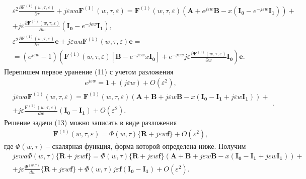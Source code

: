 \begin{equation}
	\begin{split}
		&\varepsilon^{2}\frac{\partial \boldsymbol{F}^{(1)}(w,\tau,\varepsilon)}{\partial \tau}+j\varepsilon wa\boldsymbol{F}^{(1)}(w,\tau,\varepsilon)=\boldsymbol{F}^{(1)}(w,\tau,\varepsilon)(\boldsymbol{A}+e^{j\varepsilon w}\boldsymbol{B}-x(\boldsymbol{I_{0}}-e^{-j\varepsilon w}\boldsymbol{I_{1}}))+\\
		&+j\varepsilon \frac{\partial\boldsymbol{F}^{(1)}(w,\tau,\varepsilon)}{\partial w}(\boldsymbol{I_{0}}-e^{-j\varepsilon w}\boldsymbol{I_{1}}),\\
		&\varepsilon^{2}\frac{\partial \boldsymbol{F}^{(1)}(w,\tau,\varepsilon)}{\partial \tau}\boldsymbol{e}+j\varepsilon wa\boldsymbol{F}^{(1)}(w,\tau,\varepsilon)\boldsymbol{e} =\\
		&=(e^{j\varepsilon w}-1)(\boldsymbol{F}^{(1)}(w,\tau,\varepsilon)[\boldsymbol{B}-e^{-j\varepsilon w}x\boldsymbol{I_{0}}]+e^{-j\varepsilon w}j\varepsilon \frac{\partial\boldsymbol{F}^{(1)}(w,\tau,\varepsilon)}{\partial w}\boldsymbol{I_{0}})\boldsymbol{e}.
	\end{split}
\end{equation}
Перепишем первое уранение (11) с учетом разложения
\begin{align}
	e^{j\varepsilon w}=1+(j\varepsilon w)+O(\varepsilon^2),
\end{align}
\begin{equation}
	\begin{split}
		&j\varepsilon wa\boldsymbol{F}^{(1)}(w,\tau,\varepsilon)=\boldsymbol{F}^{(1)}(w,\tau,\varepsilon)(\boldsymbol{A}+\boldsymbol{B}+j\varepsilon w\boldsymbol{B}-x(\boldsymbol{I_{0}}-\boldsymbol{I_{1}}+j\varepsilon w\boldsymbol{I_{1}}))+\\
		&+j\varepsilon \frac{\boldsymbol{F}^{(1)}(w,\tau,\varepsilon)}{dw}(\boldsymbol{I_{0}}-\boldsymbol{I_{1}})+O(\varepsilon^2).
	\end{split}.
\end{equation}
Решение задачи (13) можно записать в виде разложения
\begin{align}
	\boldsymbol{F}^{(1)}(w,\tau,\varepsilon)=\Phi (w,\tau)\{\boldsymbol{R}+j\varepsilon w \boldsymbol{f}\}+O(\varepsilon^2),
\end{align}
где $\Phi (w,\tau)$ -- скалярная функция, форма которой определена ниже.
Получим 
\begin{align*}
	&j\varepsilon wa\Phi(w,\tau)\{\boldsymbol{R}+j\varepsilon w\boldsymbol{f}\}=\Phi(w,\tau)\{\boldsymbol{R}+j\varepsilon w\boldsymbol{f}\}(\boldsymbol{A}+\boldsymbol{B}+j\varepsilon w\boldsymbol{B}-x(\boldsymbol{I_{0}}-\boldsymbol{I_{1}}+j\varepsilon w\boldsymbol{I_{1}}))+\\
	&+j\varepsilon \frac{\Phi^(w,\tau)}{dw}\{\boldsymbol{R}+j\varepsilon w\boldsymbol{f}\} +\Phi(w,\tau)j\varepsilon \boldsymbol{f}(\boldsymbol{I_{0}}-\boldsymbol{I_{1}})+O(\varepsilon^2).
\end{align*}
